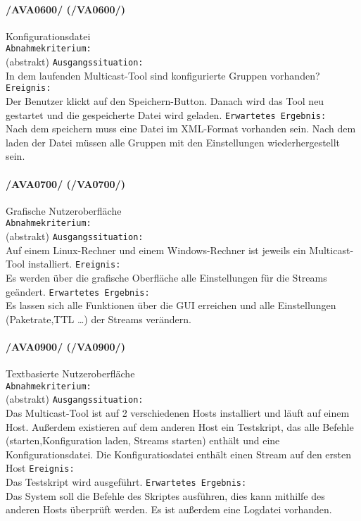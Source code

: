 \paragraph{/AVA0600/ (/VA0600/)}  Konfigurationsdatei\\ %
\texttt{Abnahmekriterium:} \\ (abstrakt)
\texttt{Ausgangssituation:} \\In dem laufenden Multicast-Tool sind konfigurierte
Gruppen vorhanden?
\texttt{Ereignis:} \\Der Benutzer klickt auf den Speichern-Button. Danach wird
das Tool neu gestartet und die gespeicherte Datei wird geladen.
\texttt{Erwartetes Ergebnis:} \\Nach dem speichern muss eine Datei im XML-Format
vorhanden sein. Nach dem laden der Datei müssen alle Gruppen mit den
Einstellungen wiederhergestellt sein.

\paragraph{/AVA0700/ (/VA0700/)} Grafische Nutzeroberfläche\\%
\texttt{Abnahmekriterium:} \\(abstrakt)
\texttt{Ausgangssituation:} \\Auf einem Linux-Rechner und einem Windows-Rechner
ist jeweils ein Multicast-Tool installiert.  
 \texttt{Ereignis:} \\Es werden über die grafische Oberfläche alle Einstellungen
 für die Streams geändert.
 \texttt{Erwartetes Ergebnis:} \\Es lassen sich alle Funktionen über die GUI
 erreichen und alle Einstellungen (Paketrate,TTL \ldots) der Streams verändern.

\paragraph{/AVA0900/ (/VA0900/)} Textbasierte Nutzeroberfläche\\%
\texttt{Abnahmekriterium:} \\(abstrakt)
\texttt{Ausgangssituation:} \\Das Multicast-Tool ist auf 2 verschiedenen Hosts
installiert und läuft auf einem Host. Außerdem existieren auf dem anderen Host
ein Testskript, das alle Befehle (starten,Konfiguration laden, Streams starten)
enthält und eine Konfigurationsdatei. Die Konfiguratiosdatei enthält einen
Stream auf den ersten Host 
\texttt{Ereignis:}\\Das Testskript wird ausgeführt. 
\texttt{Erwartetes Ergebnis:} \\Das System soll die Befehle des Skriptes
ausführen, dies kann mithilfe des anderen Hosts überprüft werden. Es ist
außerdem eine Logdatei vorhanden.

